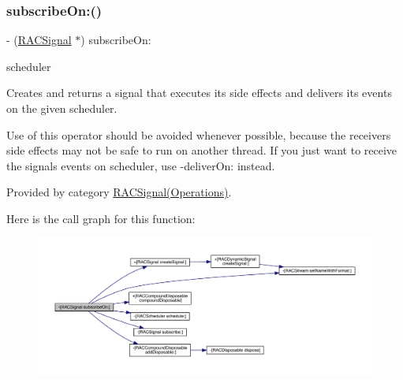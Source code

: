 \mbox{\label{interface_r_a_c_signal_a6b8db542f7106880577a943cb8e9da90}} 
\subsubsection{\texorpdfstring{subscribe\+On\+:()}{subscribeOn:()}\hspace{0.1cm}{\footnotesize\ttfamily [2/3]}}
{\footnotesize\ttfamily -\/ (\mbox{\hyperlink{interface_r_a_c_signal}{R\+A\+C\+Signal}} $\ast$) subscribe\+On\+: \begin{DoxyParamCaption}\item[{(\mbox{\hyperlink{interface_r_a_c_scheduler}{R\+A\+C\+Scheduler}} $\ast$)}]{scheduler }\end{DoxyParamCaption}}

Creates and returns a signal that executes its side effects and delivers its events on the given scheduler.

Use of this operator should be avoided whenever possible, because the receiver\textquotesingle{}s side effects may not be safe to run on another thread. If you just want to receive the signal\textquotesingle{}s events on {\ttfamily scheduler}, use -\/deliver\+On\+: instead. 

Provided by category \mbox{\hyperlink{category_r_a_c_signal_07_operations_08_a6b8db542f7106880577a943cb8e9da90}{R\+A\+C\+Signal(\+Operations)}}.

Here is the call graph for this function\+:\nopagebreak
\begin{figure}[H]
\begin{center}
\leavevmode
\includegraphics[width=350pt]{interface_r_a_c_signal_a6b8db542f7106880577a943cb8e9da90_cgraph}
\end{center}
\end{figure}
\mbox{\label{interface_r_a_c_signal_a6b8db542f7106880577a943cb8e9da90}} 
